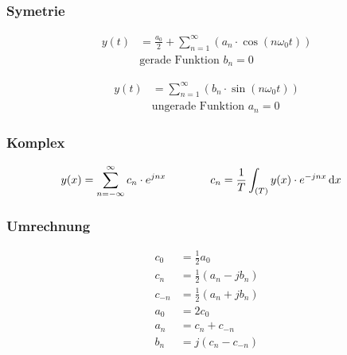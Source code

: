 \subsubsection{Symetrie}
\begin{multicols}{2}
\begin{align*}
 y(t)&=\frac{a_0}{2}+\sum_{n=1}^\infty\left(a_n\cdot\cos\left(n\omega_0 t\right)\right) \\ &\text{gerade Funktion } b_n = 0
\end{align*}

\begin{align*}
 y(t)&=\sum_{n=1}^\infty\left(b_n\cdot\sin\left(n\omega_0 t\right)\right) \\ &\text{ungerade Funktion } a_n = 0 
\end{align*}
\end{multicols}

\subsubsection{Komplex}
\begin{alignat*}{2}
y(x)&=\sum_{n=-\infty}^\infty c_n\cdot e^{jnx} &\quad\quad\quad&
c_n=\frac{1}{T}\int_{(T)}y(x)\cdot e^{-jnx}\diff x
\end{alignat*}


\subsubsection{Umrechnung}

\begin{align*}
c_0&=\frac{1}{2}a_0\\
c_n&=\frac{1}{2}\left(a_n-jb_n\right)\\
c_{-n}&=\frac{1}{2}\left(a_n+jb_n\right)\\
a_0&=2c_0\\
a_n&=c_n+c_{-n}\\
b_n&=j\left(c_n-c_{-n}\right)
\end{align*}


